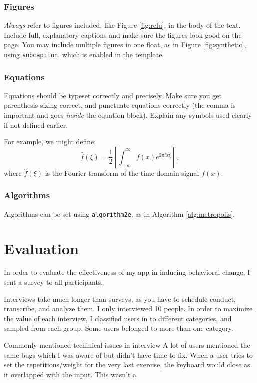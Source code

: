 \documentclass{l4proj}
\begin{document}
\subsection{Figures}
\emph{Always} refer to figures included, like Figure \ref{fig:relu}, in the body of the text. Include full, explanatory captions and make sure the figures look good on the page.
You may include multiple figures in one float, as in Figure \ref{fig:synthetic}, using \texttt{subcaption}, which is enabled in the template.


\subsection{Equations}

Equations should be typeset correctly and precisely. Make sure you get parenthesis sizing correct, and punctuate equations correctly 
(the comma is important and goes \textit{inside} the equation block). Explain any symbols used clearly if not defined earlier. 

For example, we might define:
\begin{equation}
    \hat{f}(\xi) = \frac{1}{2}\left[ \int_{-\infty}^{\infty} f(x) e^{2\pi i x \xi} \right],
\end{equation}    
where $\hat{f}(\xi)$ is the Fourier transform of the time domain signal $f(x)$.

\subsection{Algorithms}
Algorithms can be set using \texttt{algorithm2e}, as in Algorithm \ref{alg:metropolis}.

\chapter{Evaluation} 
In order to evaluate the effectiveness of my app in inducing behavioral change, I sent a survey to all participants. 

Interviews take much longer than surveys, as you have to schedule conduct, transcribe, and analyze them. I only interviewed 10 people. In order to maximize the value of each interview, I classified users in to different categories, and sampled from each group. Some users belonged to more than one category. 

Commonly mentioned techinical issues in interview
A lot of users mentioned the same bugs which I was aware of but didn't have time to fix. When a user tries to set the repetitions/weight for the very last exercise, the keyboard would close as it overlapped with the input. This wasn't a 
\end{document}
